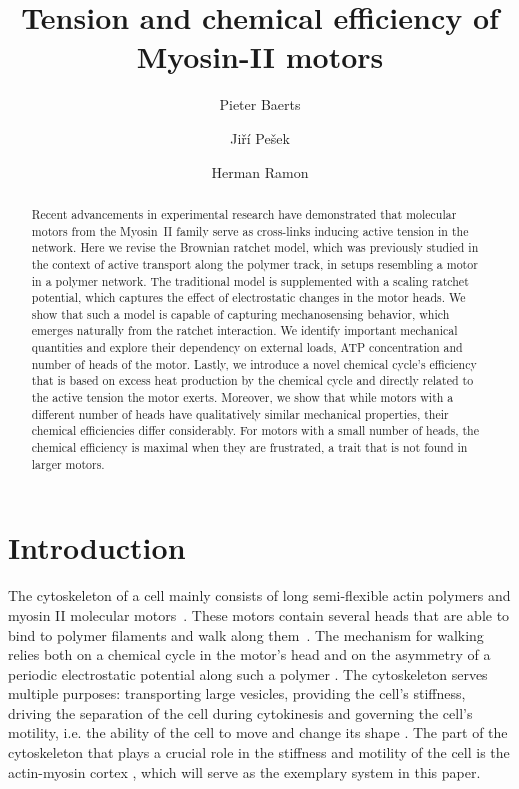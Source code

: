 \documentclass[aps,pre,twocolumn,showpacs,showkeys,superscriptaddress,floatfix]{revtex4-1}
\begin{document}
 

\title{Tension and chemical efficiency of Myosin-II motors}
\author{Pieter Baerts}
\author{Jiří Pešek}
\author{Herman Ramon}


\begin{abstract}
Recent advancements in experimental research have demonstrated that molecular motors from the Myosin~II family serve as cross-links inducing active tension in the network. 
Here we revise the Brownian ratchet model, 
which was previously studied in the context of active transport along the polymer track, in setups resembling a motor in a polymer network.
The traditional model is supplemented with a scaling ratchet potential, which captures the effect of electrostatic changes in the motor heads. 
We show that such a model is capable of capturing mechanosensing behavior, which emerges naturally from the ratchet interaction.
We identify important mechanical quantities and explore their dependency on external loads, ATP concentration and number of heads of the motor.
Lastly, we introduce a novel chemical cycle's efficiency that is based on excess heat production by the chemical cycle and directly related to the active tension the motor exerts.
Moreover, we show that while motors with a different number of heads have qualitatively similar mechanical properties, 
their chemical efficiencies differ considerably.
For motors with a small number of heads, the chemical efficiency is maximal when they are frustrated, a trait that is not found in larger motors. 
\end{abstract}

\maketitle 

\section{Introduction}
The cytoskeleton of a cell mainly consists of long semi-flexible actin polymers and myosin II molecular motors~\cite{mitchison1996actin}. 
These motors contain several heads that are able to bind to polymer filaments and walk along them~\cite{pollard1982structure}. 
The mechanism for walking relies both on a chemical cycle in the motor's head and on the asymmetry of a periodic electrostatic potential along such a polymer \cite{Reimann2002introduction}. 
The cytoskeleton serves multiple purposes: 
transporting large vesicles, providing the cell's stiffness, driving the separation of the cell during cytokinesis and governing the cell's motility, i.e. the ability of the cell to move and change its shape \cite{ross2008cargo,mitchison1996actin,rosenblatt2004myosin}.
The part of the cytoskeleton that plays a crucial role in the stiffness and motility of the cell is the actin-myosin cortex \cite{vicente2009non}, which will serve as the exemplary system in this paper.
\end{document}
